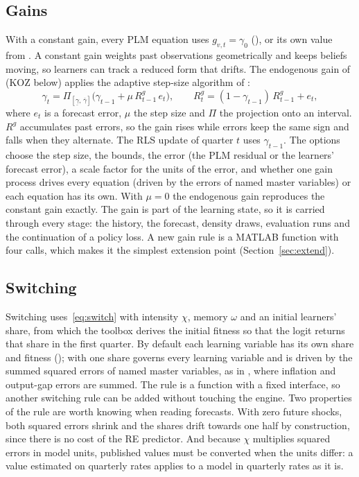 \documentclass[pdflatex,sn-basic]{sn-jnl}
\DeclareRobustCommand{\code}[1]{\texttt{\detokenize{#1}}}
\begin{document}
\subsection{Gains}\label{sec:gains}

With a constant gain, every PLM equation uses $g_{v,t}=\gamma_0$ (\code{gain.value}), or its
own value from \code{gain.by_var}. A constant gain weights past observations geometrically and
keeps beliefs moving, so learners can track a reduced form that drifts. The endogenous gain of
\citet{koz2024} (KOZ below) applies the adaptive step-size algorithm of \citet{kostyshyna2012}:
\begin{equation}\label{eq:koz}
  \gamma_{t} = \Pi_{[\underline{\gamma},\,\overline{\gamma}]}\bigl(\gamma_{t-1} + \mu\, R^{g}_{t-1}\, e_{t}\bigr), \qquad
  R^{g}_{t} = (1-\gamma_{t-1})\, R^{g}_{t-1} + e_{t},
\end{equation}
where $e_t$ is a forecast error, $\mu$ the step size and $\Pi$ the projection onto an interval.
$R^g$ accumulates past errors, so the gain rises while errors keep the same sign and falls when
they alternate. The RLS update of quarter $t$ uses $\gamma_{t-1}$. The options choose the step
size, the bounds, the error (the PLM residual or the learners' forecast error), a scale factor
for the units of the error, and whether one gain process drives every equation (driven by the
errors of named master variables) or each equation has its own. With $\mu=0$ the endogenous gain
reproduces the constant gain exactly. The gain is part of the learning state, so it is carried
through every stage: the history, the forecast, density draws, evaluation runs and the
continuation of a policy loss. A new gain rule is a MATLAB function with four calls, which makes
it the simplest extension point (Section~\ref{sec:extend}).

\subsection{Switching}\label{sec:switching}

Switching uses~\eqref{eq:switch} with intensity $\chi$, memory $\omega$ and an initial learners'
share, from which the toolbox derives the initial fitness so that the logit returns that share
in the first quarter. By default each learning variable has its own share and fitness
(\code{'per_variable'}); with \code{'universal'} one share governs every learning variable and is
driven by the summed squared errors of named master variables, as in \citet{ozden2025}, where
inflation and output-gap errors are summed. The rule is a function with a fixed interface, so
another switching rule can be added without touching the engine. Two properties of the rule are
worth knowing when reading forecasts. With zero future shocks, both squared errors shrink and
the shares drift towards one half by construction, since there is no cost of the RE predictor.
And because $\chi$ multiplies squared errors in model units, published values must be converted
when the units differ: a value estimated on quarterly rates applies to a model in quarterly
rates as it is.
\end{document}
